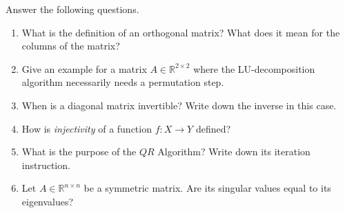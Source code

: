 Answer the following questions.
\begin{enumerate}
	\item What is the definition of an orthogonal matrix? What does it mean for the columns of the matrix?
	\item Give an example for a matrix $A \in \mathbb{R}^{2 \times 2}$ where the LU-decomposition algorithm
	necessarily needs a permutation step.
	\item When is a diagonal matrix invertible? Write down the inverse in this case.
	\item How is \textit{injectivity} of a function $f\colon X \to Y$ defined?
	\item What is the purpose of the $QR$ Algorithm? Write down its iteration instruction.
	\item Let $A \in \mathbb{R}^{n \times n}$ be a symmetric matrix. Are its singular values equal to its eigenvalues? 
\end{enumerate}
